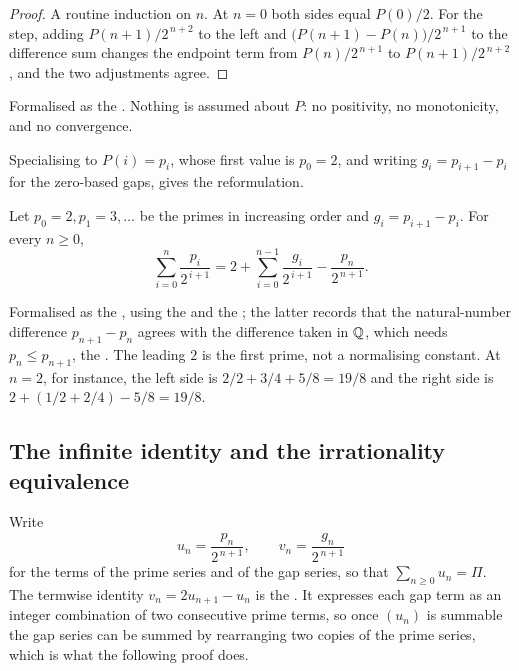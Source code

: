 \documentclass[11pt]{article}
\begin{document}
\begin{proof}
A routine induction on $n$.  At $n=0$ both sides equal $P(0)/2$.  For the step, adding
$P(n+1)/2^{\,n+2}$ to the left and
$\bigl(P(n+1)-P(n)\bigr)/2^{\,n+1}$ to the difference sum changes the endpoint
term from $P(n)/2^{\,n+1}$ to $P(n+1)/2^{\,n+2}$, and the two adjustments agree.
\end{proof}

\noindent Formalised as the
.  Nothing is assumed about $P$: no positivity, no monotonicity, and no
convergence.

Specialising to $P(i)=p_i$, whose first value is $p_0=2$, and writing
$g_i=p_{i+1}-p_i$ for the zero-based gaps, gives the reformulation.

\begin{theorem}\label{res:parts}
Let $p_0=2,p_1=3,\ldots$ be the primes in increasing order and
$g_i=p_{i+1}-p_i$.  For every $n\ge0$,
\[
 \sum_{i=0}^{n}\frac{p_i}{2^{\,i+1}}
 =2+\sum_{i=0}^{n-1}\frac{g_i}{2^{\,i+1}}-\frac{p_n}{2^{\,n+1}} .
\]
\end{theorem}

\noindent Formalised as the
, using the
 and the
; the latter records that the natural-number difference
$p_{n+1}-p_n$ agrees with the difference taken in $\mathbb{Q}$, which needs
$p_n\le p_{n+1}$, the
.  The leading $2$ is the first prime, not a normalising constant.
At $n=2$, for instance, the left side is $2/2+3/4+5/8=19/8$ and the right side
is $2+(1/2+2/4)-5/8=19/8$.

\subsection{The infinite identity and the irrationality equivalence}\label{sec:infinite}

Write
\[
 u_n=\frac{p_n}{2^{\,n+1}},\qquad
 v_n=\frac{g_n}{2^{\,n+1}}
\]
for the terms of the prime series and of the gap series, so that
$\sum_{n\ge0}u_n=\Pi$.  The termwise identity $v_n=2u_{n+1}-u_n$ is the
.  It expresses each gap term as an integer combination of
two consecutive prime terms, so once $(u_n)$ is summable the gap series can be
summed by rearranging two copies of the prime series, which is what the
following proof does.
\end{document}
